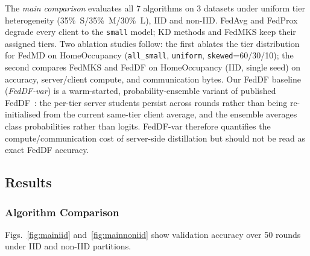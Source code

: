 \documentclass[conference]{IEEEtran}
\begin{document}
The \emph{main comparison} evaluates all 7 algorithms on 3 datasets
under uniform tier heterogeneity (35\%~S/35\%~M/30\%~L), IID and
non-IID.  FedAvg and FedProx degrade every client to the
\texttt{small} model; KD methods and FedMKS keep their assigned tiers.
Two ablation studies follow: the first ablates the tier distribution
for FedMD on HomeOccupancy (\texttt{all\_small}, \texttt{uniform},
\texttt{skewed}=60/30/10); the second compares FedMKS and FedDF on
HomeOccupancy (IID, single seed) on accuracy, server/client compute,
and communication bytes.  Our FedDF baseline (\emph{FedDF-var}) is a
warm-started, probability-ensemble variant of published
FedDF~\cite{lin2020ensemble}: the per-tier server students persist
across rounds rather than being re-initialised from the current
same-tier client average, and the ensemble averages class
probabilities rather than logits.  FedDF-var therefore quantifies
the compute/communication cost of server-side distillation but
should not be read as exact FedDF accuracy.

\subsection{Results}

\subsubsection{Algorithm Comparison}

Figs.~\ref{fig:mainiid} and~\ref{fig:mainnoniid} show validation
accuracy over 50 rounds under IID and non-IID partitions.
\end{document}
